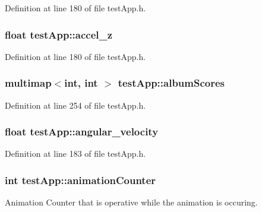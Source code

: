 Definition at line 180 of file test\-App.\-h.

\hypertarget{classtest_app_a61dbdd5c0b868568dde40a52f6e56054}{
\subsubsection[{accel\-\_\-z}]{\setlength{\rightskip}{0pt plus 5cm}float test\-App\-::accel\-\_\-z}}\label{classtest_app_a61dbdd5c0b868568dde40a52f6e56054}


Definition at line 180 of file test\-App.\-h.

\hypertarget{classtest_app_aa16e3bba73f9adb3c6363ac429e5a472}{
\subsubsection[{album\-Scores}]{\setlength{\rightskip}{0pt plus 5cm}multimap$<$int, int $>$ test\-App\-::album\-Scores}}\label{classtest_app_aa16e3bba73f9adb3c6363ac429e5a472}


Definition at line 254 of file test\-App.\-h.

\hypertarget{classtest_app_a98e05c3206ff95fccfebfc9df5317598}{
\subsubsection[{angular\-\_\-velocity}]{\setlength{\rightskip}{0pt plus 5cm}float test\-App\-::angular\-\_\-velocity}}\label{classtest_app_a98e05c3206ff95fccfebfc9df5317598}


Definition at line 183 of file test\-App.\-h.

\hypertarget{classtest_app_a21b16bdba744425519597fcb925df43a}{
\subsubsection[{animation\-Counter}]{\setlength{\rightskip}{0pt plus 5cm}int test\-App\-::animation\-Counter}}\label{classtest_app_a21b16bdba744425519597fcb925df43a}


Animation Counter that is operative while the animation is occuring. 




